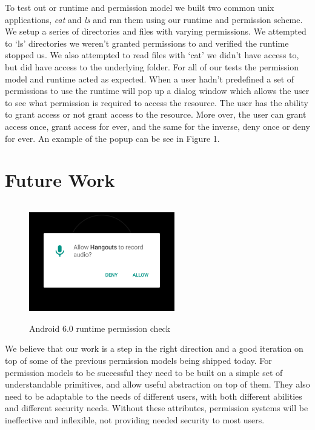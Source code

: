 To test out or runtime and permission model we built two common unix applications, \textit{cat} and \textit{ls} and ran them using our runtime and permission scheme. We setup a series of directories and files with varying permissions. We attempted to `ls' directories we weren't granted permissions to and verified the runtime stopped us. We also attempted to read files with `cat' we didn't have access to, but did have access to the underlying folder. For all of our tests the permission model and runtime acted as expected. When a user hadn't predefined a set of permissions to use the runtime will pop up a dialog window which allows the user to see what permission is required to access the resource. The user has the ability to grant access or not grant access to the resource. More over, the user can grant access once, grant access for ever, and the same for the inverse, deny once or deny for ever. An example of the popup can be see in Figure 1.


\section{Future Work}\label{section:futurework}

\begin{figure}[h]
\centering
\includegraphics[height=2in, width=2.5in]{app.png}
\caption{Android 6.0 runtime permission check}
\end{figure}

We believe that our work is a step in the right direction and a good iteration on top of some of the previous permission models being shipped today. 
For permission models to be successful they need to be built on a simple set of understandable primitives, and allow useful abstraction on top of them.
They also need to be adaptable to the needs of different users, with both different abilities and different security needs.
Without these attributes, permission systems will be ineffective and inflexible, not providing needed security to most users.

